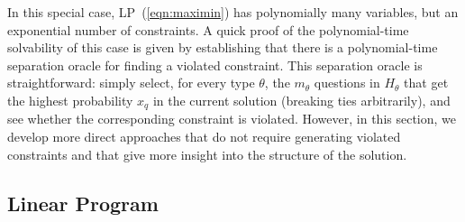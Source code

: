 \documentclass{article}
\begin{document}
In this special case, LP~(\ref{eqn:maximin}) has polynomially many
variables, but an exponential number of constraints.  A quick proof of the
polynomial-time solvability of this case is given by establishing that
there is a polynomial-time separation oracle for finding a violated constraint.
This separation oracle is straightforward: simply select, for every type
$\theta$, the $m_\theta$ questions in $H_\theta$ that get the highest
probability $x_q$ in the current solution (breaking ties arbitrarily), and
see whether the corresponding constraint is violated.  However, in this
section, we develop more direct approaches that do not require generating
violated constraints and that give more insight into the structure of the solution.




\subsection{Linear Program}
\end{document}
